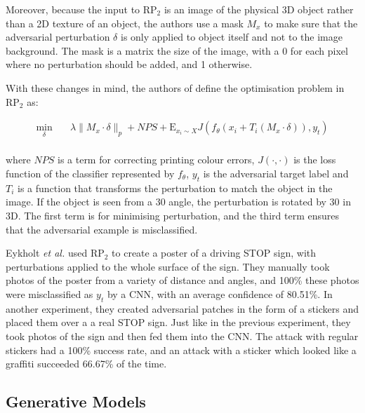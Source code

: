 \documentclass[11pt, a4paper, oneside]{article}
\begin{document}
Moreover, because the input to $\textrm{RP}_2$ is an image of the physical 3D object rather than a 2D texture of an object, the authors use a mask $M_x$ to make sure that the adversarial perturbation $\delta$ is only applied to object itself and not to the image background. The mask is a matrix the size of the image, with a 0 for each pixel where no perturbation should be added, and 1 otherwise. 

With these changes in mind, the authors of \cite{evtimov_road_signs} define the optimisation problem in $\textrm{RP}_2$ as:

\begin{equation}
\begin{aligned}
\min_{\delta} \quad & \lambda\|M_x \cdot \delta\|_p + NPS + \mathrm{E}_{x_i\sim X}J(f_\theta(x_i + T_i(M_x \cdot \delta)), y_t)\\
\label{eq:rp2}
\end{aligned}
\end{equation}

\noindent where $NPS$ is a term for correcting printing colour errors, $J(\cdot, \cdot)$ is the loss function of the classifier represented by $f_\theta$, $y_t$ is the adversarial target label and $T_i$ is a function that transforms the perturbation to match the object in the image. If the object is seen from a 30\degree{} angle, the perturbation is rotated by 30\degree{} in 3D. The first term is for minimising perturbation, and the third term ensures that the adversarial example is misclassified.

Eykholt \textit{et al.} used $\textrm{RP}_2$ to create a poster of a driving STOP sign, with perturbations applied to the whole surface of the sign. They manually took photos of the poster from a variety of distance and angles, and 100\% these photos were misclassified as $y_t$ by a CNN, with an average confidence of 80.51\%. In another experiment, they created adversarial patches in the form of a stickers and placed them over a a real STOP sign. Just like in the previous experiment, they took photos of the sign and then fed them into the CNN. The attack with regular stickers had a 100\% success rate, and an attack with a sticker which looked like a graffiti succeeded 66.67\% of the time.

\subsection{Generative Models}
    \label{subsec:generative_models}
\end{document}
